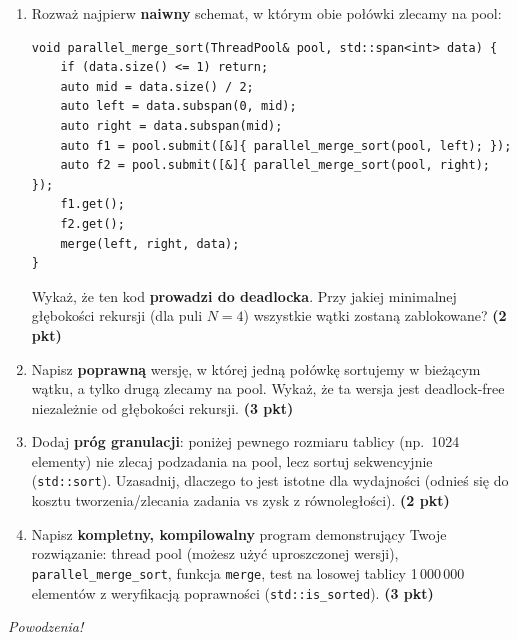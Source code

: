 \documentclass[11pt,a4paper]{article}
\newcommand{\pkt}[1]{\hfill\textbf{(#1 pkt)}}
\begin{document}
\begin{enumerate}[label=(\alph*)]
\item Rozważ najpierw \textbf{naiwny} schemat, w którym obie połówki zlecamy na pool:
\begin{lstlisting}
void parallel_merge_sort(ThreadPool& pool, std::span<int> data) {
    if (data.size() <= 1) return;
    auto mid = data.size() / 2;
    auto left = data.subspan(0, mid);
    auto right = data.subspan(mid);
    auto f1 = pool.submit([&]{ parallel_merge_sort(pool, left); });
    auto f2 = pool.submit([&]{ parallel_merge_sort(pool, right); });
    f1.get();
    f2.get();
    merge(left, right, data);
}
\end{lstlisting}
Wykaż, że ten kod \textbf{prowadzi do deadlocka}. Przy jakiej minimalnej głębokości rekursji (dla puli $N=4$) wszystkie wątki zostaną zablokowane? \pkt{2}

\item Napisz \textbf{poprawną} wersję, w której jedną połówkę sortujemy w bieżącym wątku, a tylko drugą zlecamy na pool. Wykaż, że ta wersja jest deadlock-free niezależnie od głębokości rekursji. \pkt{3}

\item Dodaj \textbf{próg granulacji}: poniżej pewnego rozmiaru tablicy (np.\ 1024 elementy) nie zlecaj podzadania na pool, lecz sortuj sekwencyjnie (\texttt{std::sort}). Uzasadnij, dlaczego to jest istotne dla wydajności (odnieś się do kosztu tworzenia/zlecania zadania vs zysk z równoległości). \pkt{2}

\item Napisz \textbf{kompletny, kompilowalny} program demonstrujący Twoje rozwiązanie: thread pool (możesz użyć uproszczonej wersji), \texttt{parallel\_merge\_sort}, funkcja \texttt{merge}, test na losowej tablicy 1\,000\,000 elementów z weryfikacją poprawności (\texttt{std::is\_sorted}). \pkt{3}
\end{enumerate}

\vspace{1cm}
\begin{center}
	{\small \textit{Powodzenia!}}
\end{center}
\end{document}
